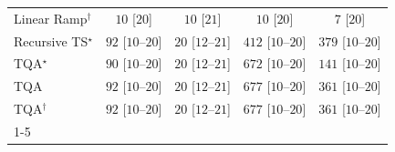 \begin{tabular}{l|cccc|}
Linear Ramp$^\dagger$ & {\cellcolor[HTML]{F6FCF4}} \color[HTML]{000000} $10$ [$20$] & {\cellcolor[HTML]{F6FCF4}} \color[HTML]{000000} $10$ [$21$] & {\cellcolor[HTML]{F6FCF4}} \color[HTML]{000000} $10$ [$20$] & {\cellcolor[HTML]{F6FCF4}} \color[HTML]{000000} $7$ [$20$] \\
Recursive TS$^\star$ & {\cellcolor[HTML]{E7F6E2}} \color[HTML]{000000} $92$ [$10$--$20$] & {\cellcolor[HTML]{F4FBF1}} \color[HTML]{000000} $20$ [$12$--$21$] & {\cellcolor[HTML]{68BE70}} \color[HTML]{000000} $412$ [$10$--$20$] & {\cellcolor[HTML]{79C67A}} \color[HTML]{000000} $379$ [$10$--$20$] \\
TQA$^\star$ & {\cellcolor[HTML]{E7F6E2}} \color[HTML]{000000} $90$ [$10$--$20$] & {\cellcolor[HTML]{F4FBF1}} \color[HTML]{000000} $20$ [$12$--$21$] & {\cellcolor[HTML]{03702E}} \color[HTML]{F1F1F1} $672$ [$10$--$20$] & {\cellcolor[HTML]{D8F0D2}} \color[HTML]{000000} $141$ [$10$--$20$] \\
TQA & {\cellcolor[HTML]{E7F6E2}} \color[HTML]{000000} $92$ [$10$--$20$] & {\cellcolor[HTML]{F4FBF1}} \color[HTML]{000000} $20$ [$12$--$21$] & {\cellcolor[HTML]{016E2D}} \color[HTML]{F1F1F1} $677$ [$10$--$20$] & {\cellcolor[HTML]{81CA81}} \color[HTML]{000000} $361$ [$10$--$20$] \\
TQA$^\dagger$ & {\cellcolor[HTML]{E7F6E2}} \color[HTML]{000000} $92$ [$10$--$20$] & {\cellcolor[HTML]{F4FBF1}} \color[HTML]{000000} $20$ [$12$--$21$] & {\cellcolor[HTML]{016E2D}} \color[HTML]{F1F1F1} $677$ [$10$--$20$] & {\cellcolor[HTML]{81CA81}} \color[HTML]{000000} $361$ [$10$--$20$] \\
\cline{1-5}
\bottomrule
\end{tabular}
